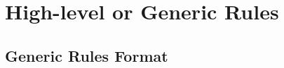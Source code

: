 \section{High-level or Generic Rules}

\subsection{\label{sec:cps:genericrules}Generic Rules Format}





